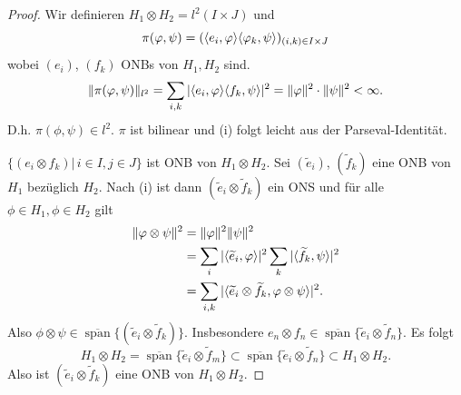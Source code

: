 \documentclass{mycourse}
\begin{document}
\begin{proof}
Wir definieren $H_1 \otimes H_2= l^2(I\times J)$ und 
\[
\pi(\varphi, \psi) = (\langle e_i, \varphi \rangle \langle \varphi_k, \psi\rangle )_{(i,k)\in I \times J}
\]
wobei $(e_i)$, $(f_k)$ ONBs von $H_1, H_2$ sind.
\[
\| \pi(\varphi, \psi) \|_{l^2} = \sum_{i,k} |\langle e_i, \varphi\rangle \langle f_k, \psi\rangle|^2 = \|\varphi\|^2 \cdot \| \psi\|^2 < \infty.
\]
D.h. $\pi(\phi,\psi)\in l^2$. $\pi$ ist bilinear und (i) folgt leicht aus der Parseval-Identität.

$\{(e_i \otimes f_k) | \, i\in I, j\in J\}$ ist ONB von $H_1 \otimes H_2$. Sei $(\tilde e_i)$, $(\tilde f_k)$ eine ONB von $H_1$ bezüglich $H_2$. Nach (i) ist dann $(\tilde e_i \otimes \tilde f_k)$ ein ONS und für alle $\phi \in H_1, \phi \in H_2$ gilt
\begin{align*}
\| \varphi \otimes \psi\|^2 &= \| \varphi \|^2 \|\psi\|^2\\
&= \sum_i |\langle\widetilde e_i, \varphi\rangle|^2 \sum_k | \langle \widetilde f_k, \psi \rangle|^2\\
&= \sum_{i,k} |\langle\widetilde e_i \otimes \widetilde f_k, \varphi \otimes \psi\rangle|^2.
\end{align*}
Also $\phi \otimes \psi \in \overline{\operatorname{span}}\{(\tilde e_i \otimes \tilde f_k)\}$. Insbesondere $e_n \otimes f_n \in \overline{\operatorname{span}}\{\tilde e_i \otimes \tilde f_n\}$. Es folgt
\[
H_1 \otimes H_2 = \overline{\operatorname{span}}\{\tilde e_i \otimes \tilde f_m\} \subset \overline{\operatorname{span}} \{\tilde e_i \otimes \tilde f_n\} \subset H_1 \otimes H_2.
\]
Also ist $(\tilde e_i \otimes \tilde f_k)$ eine ONB von $H_1 \otimes H_2$.
%

\end{proof}
\end{document}
